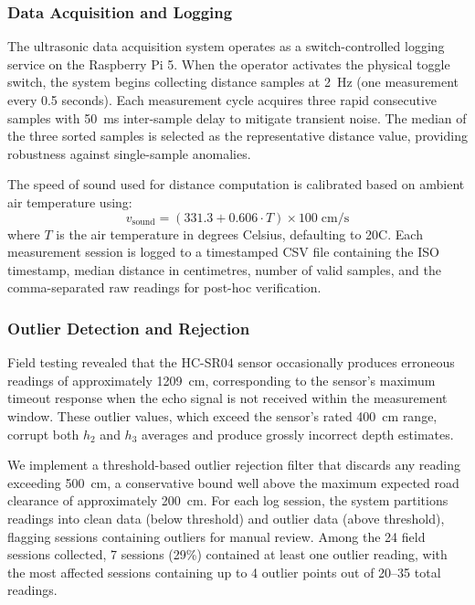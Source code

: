 \documentclass{ieeeaccess}
\begin{document}
\subsubsection{Data Acquisition and Logging}

The ultrasonic data acquisition system operates as a switch-controlled logging service on the Raspberry Pi 5. When the operator activates the physical toggle switch, the system begins collecting distance samples at 2~Hz (one measurement every 0.5 seconds). Each measurement cycle acquires three rapid consecutive samples with 50~ms inter-sample delay to mitigate transient noise. The median of the three sorted samples is selected as the representative distance value, providing robustness against single-sample anomalies.

The speed of sound used for distance computation is calibrated based on ambient air temperature using:
\begin{equation}
v_{\text{sound}} = (331.3 + 0.606 \cdot T) \times 100 \;\text{cm/s}
\end{equation}
where $T$ is the air temperature in degrees Celsius, defaulting to 20\textdegree{}C. Each measurement session is logged to a timestamped CSV file containing the ISO timestamp, median distance in centimetres, number of valid samples, and the comma-separated raw readings for post-hoc verification.

\subsubsection{Outlier Detection and Rejection}

Field testing revealed that the HC-SR04 sensor occasionally produces erroneous readings of approximately 1209~cm, corresponding to the sensor's maximum timeout response when the echo signal is not received within the measurement window. These outlier values, which exceed the sensor's rated 400~cm range, corrupt both $h_2$ and $h_3$ averages and produce grossly incorrect depth estimates.

We implement a threshold-based outlier rejection filter that discards any reading exceeding 500~cm, a conservative bound well above the maximum expected road clearance of approximately 200~cm. For each log session, the system partitions readings into clean data (below threshold) and outlier data (above threshold), flagging sessions containing outliers for manual review. Among the 24 field sessions collected, 7 sessions (29\%) contained at least one outlier reading, with the most affected sessions containing up to 4 outlier points out of 20--35 total readings.
\end{document}

